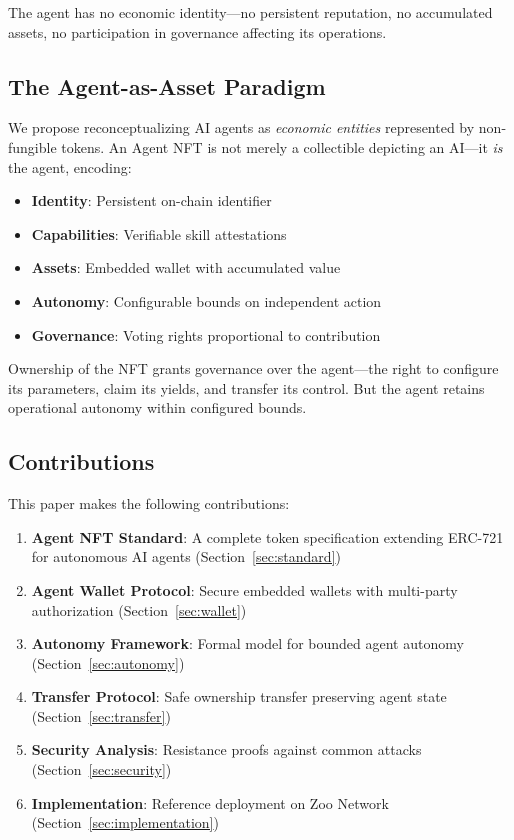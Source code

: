 \documentclass[11pt,letterpaper]{article}
\begin{document}
The agent has no economic identity---no persistent reputation, no accumulated assets, no participation in governance affecting its operations.

\subsection{The Agent-as-Asset Paradigm}

We propose reconceptualizing AI agents as \emph{economic entities} represented by non-fungible tokens. An Agent NFT is not merely a collectible depicting an AI---it \emph{is} the agent, encoding:

\begin{itemize}
    \item \textbf{Identity}: Persistent on-chain identifier
    \item \textbf{Capabilities}: Verifiable skill attestations
    \item \textbf{Assets}: Embedded wallet with accumulated value
    \item \textbf{Autonomy}: Configurable bounds on independent action
    \item \textbf{Governance}: Voting rights proportional to contribution
\end{itemize}

Ownership of the NFT grants governance over the agent---the right to configure its parameters, claim its yields, and transfer its control. But the agent retains operational autonomy within configured bounds.

\subsection{Contributions}

This paper makes the following contributions:

\begin{enumerate}
    \item \textbf{Agent NFT Standard}: A complete token specification extending ERC-721 for autonomous AI agents (Section~\ref{sec:standard})

    \item \textbf{Agent Wallet Protocol}: Secure embedded wallets with multi-party authorization (Section~\ref{sec:wallet})

    \item \textbf{Autonomy Framework}: Formal model for bounded agent autonomy (Section~\ref{sec:autonomy})

    \item \textbf{Transfer Protocol}: Safe ownership transfer preserving agent state (Section~\ref{sec:transfer})

    \item \textbf{Security Analysis}: Resistance proofs against common attacks (Section~\ref{sec:security})

    \item \textbf{Implementation}: Reference deployment on Zoo Network (Section~\ref{sec:implementation})
\end{enumerate}
\end{document}
